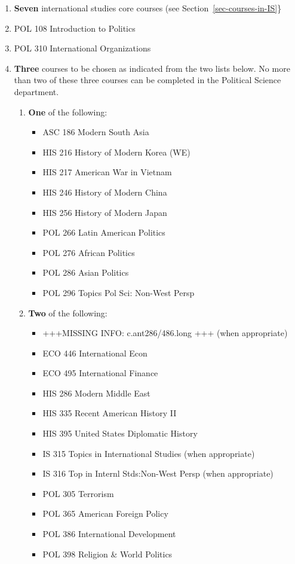 \documentclass[
  letterpaper,
]{scrbook}
\providecommand{\tightlist}{%
  \setlength{\itemsep}{0pt}\setlength{\parskip}{0pt}}
\begin{document}
\begin{enumerate}
\def\labelenumi{\arabic{enumi}.}
\item
  \textbf{Seven} international studies core courses (see
  Section~\ref{sec-courses-in-IS}\}
\item
  POL 108 Introduction to Politics
\item
  POL 310 International Organizations
\item
  \textbf{Three} courses to be chosen as indicated from the two lists
  below. No more than two of these three courses can be completed in the
  Political Science department.

  \begin{enumerate}
  \def\labelenumii{\alph{enumii}.}
  \tightlist
  \item
    \textbf{One} of the following:

    \begin{itemize}
    \tightlist
    \item
      ASC 186 Modern South Asia
    \item
      HIS 216 History of Modern Korea (WE)
    \item
      HIS 217 American War in Vietnam
    \item
      HIS 246 History of Modern China
    \item
      HIS 256 History of Modern Japan
    \item
      POL 266 Latin American Politics
    \item
      POL 276 African Politics
    \item
      POL 286 Asian Politics
    \item
      POL 296 Topics Pol Sci: Non-West Persp
    \end{itemize}
  \item
    \textbf{Two} of the following:

    \begin{itemize}
    \tightlist
    \item
      +++MISSING INFO: c.ant286/486.long +++ (when appropriate)
    \item
      ECO 446 International Econ
    \item
      ECO 495 International Finance
    \item
      HIS 286 Modern Middle East
    \item
      HIS 335 Recent American History II
    \item
      HIS 395 United States Diplomatic History
    \item
      IS 315 Topics in International Studies (when appropriate)
    \item
      IS 316 Top in Internl Stds:Non-West Persp (when appropriate)
    \item
      POL 305 Terrorism
    \item
      POL 365 American Foreign Policy
    \item
      POL 386 International Development
    \item
      POL 398 Religion \& World Politics
    \end{itemize}
  \end{enumerate}
\end{enumerate}
\end{document}
